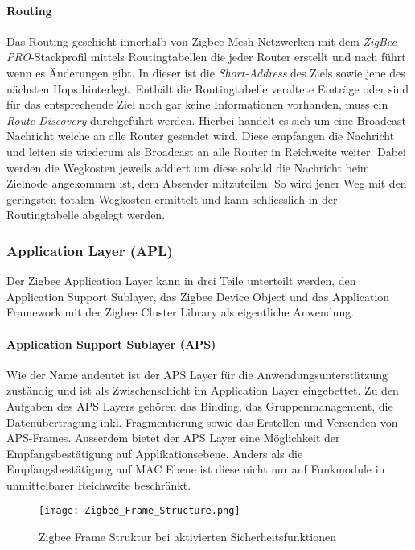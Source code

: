 \paragraph{Routing}\label{par:Zigbee Routing}
Das Routing geschieht innerhalb von Zigbee Mesh Netzwerken mit dem \textit{ZigBee PRO}-Stackprofil mittels Routingtabellen die jeder Router erstellt und nach führt wenn es Änderungen gibt. In dieser ist die \textit{Short-Address} des Ziels sowie jene des nächsten Hops hinterlegt.
Enthält die Routingtabelle veraltete Einträge oder sind für das entsprechende Ziel noch gar keine Informationen vorhanden, muss ein \textit{Route Discovery} durchgeführt werden.
Hierbei handelt es sich um eine Broadcast Nachricht welche an alle Router gesendet wird. Diese empfangen die Nachricht und leiten sie wiederum als Broadcast an alle Router in Reichweite weiter. Dabei werden die Wegkosten jeweils addiert um diese sobald die Nachricht beim Zielnode angekommen ist, dem Absender mitzuteilen.
So wird jener Weg mit den geringsten totalen Wegkosten ermittelt und kann schliesslich in der Routingtabelle abgelegt werden.


\subsubsection{Application Layer (APL)}\label{subsubsec:ZigbeeApplicationLayer}
Der Zigbee Application Layer kann in drei Teile unterteilt werden, den Application Support Sublayer, das Zigbee Device Object und das Application Framework mit der Zigbee Cluster Library als eigentliche Anwendung.

\paragraph{Application Support Sublayer (APS)}\label{par:ZigbeeApplicationSupportSublayer}
Wie der Name andeutet ist der APS Layer für die Anwendungsunterstützung zuständig und ist als Zwischenschicht im Application Layer eingebettet.
Zu den Aufgaben des APS Layers gehören das Binding, das Gruppenmanagement, die Datenübertragung inkl. Fragmentierung sowie das Erstellen und Versenden von APS-Frames.
Ausserdem bietet der APS Layer eine Möglichkeit der Empfangsbestätigung auf Applikationsebene. Anders als die Empfangsbestätigung auf MAC Ebene ist diese nicht nur auf Funkmodule in unmittelbarer Reichweite beschränkt.

\begin{figure}[h]
	\centering
	\texttt{[image: Zigbee\_Frame\_Structure.png]}
	\caption{Zigbee Frame Struktur bei aktivierten Sicherheitsfunktionen \cite[S.~286]{markus_krause_rainer_konrad_zigbee_2014}}
	\label{fig:ZigbeeFrameStruktur}
\end{figure}


